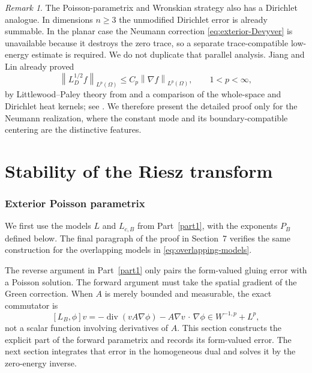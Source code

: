 \documentclass[12pt]{amsart}
\newcommand{\cdo}{\, \cdot \,}
\newcommand{\diver}{\operatorname{div}}
\newcommand{\norm}[2]{\left\lVert #1\right\rVert_{#2}}
\theoremstyle{remark}
\newtheorem{remark}[theorem]{Remark}
\begin{document}
\begin{remark}\label{rem:Dirichlet-reverse}
The Poisson-parametrix and Wronskian strategy also has a Dirichlet
analogue.  In dimensions $n\geq3$ the unmodified Dirichlet error is already
summable.  In the planar case the Neumann correction
\eqref{eq:exterior-Devyver} is unavailable because it destroys the zero
trace, so a separate trace-compatible low-energy estimate is required.
We do not duplicate that parallel analysis.  Jiang and Lin already proved
\[
 \norm{L_D^{1/2}f}{L^p(\Omega)}
 \leq C_p\norm{\nabla f}{L^p(\Omega)},
 \qquad 1<p<\infty,
\]
by Littlewood--Paley theory from \cite{KillipVisanZhang16} and a comparison of the whole-space and
Dirichlet heat kernels; see
\cite[Theorem~1.3 and Section~2]{JiangLin24}.  We therefore present the
detailed proof only for the Neumann realization, where the constant mode
and its boundary-compatible centering are the distinctive features.
\end{remark}







\part{Stability of the Riesz transform}\label{part2}

\section{Exterior Poisson parametrix}
\label{sec:forward-parametrix}

We first use the models $L$ and $L_{c,B}$ from Part~\ref{part1}, with
the exponents $P_B$ defined below.  The final paragraph of the proof in
Section~7 verifies the same construction for the overlapping models in
\eqref{eq:overlapping-models}.

The reverse argument in Part~\ref{part1} only pairs the form-valued gluing error with a Poisson solution.  The forward argument must take the spatial gradient of the Green correction.  When $A$ is merely bounded and measurable, the exact
commutator is
\[
 [L_B,\phi]v=-\diver(vA\nabla\phi)-A\nabla v\mathbin{\cdo}\nabla\phi
 \in W^{-1,p}+L^p,
\]
not a scalar function involving derivatives of $A$.  This section constructs the explicit part of the forward parametrix and records its form-valued error.  The next section integrates that error in the homogeneous
dual and solves it by the zero-energy inverse.
\end{document}
